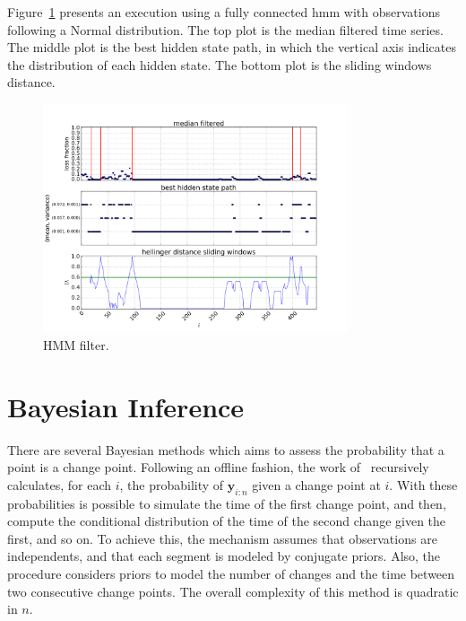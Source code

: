 Figure~\ref{fig:hmm_filter} presents an execution using a fully connected \gls*{hmm}
with observations following a Normal distribution.
The top plot is the median filtered time series.
The middle plot is the best hidden state path, in which the vertical axis
indicates the distribution of each hidden state.
The bottom plot is the sliding windows distance.

\begin{figure}[H]
    \centering
    \includegraphics[width=0.8\textwidth]{./figures/change_point_detection/gaussian_hmm/id115_serverRJODTCLDM031_mac64:66:B3:7B:A1:B8_dtstart2016-05-01_dtend2016-05-11.png}
    \caption{HMM filter.}
\label{fig:hmm_filter}
\end{figure}%

\section{Bayesian Inference}

There are several Bayesian methods which aims to assess the probability that a
point is a change point. Following an offline fashion, the work
of~\cite{exact_and_efficient_bayesian_inference_for_multiple_changepoint_problems}
recursively calculates, for each $i$, the probability of $\mathbf{y}_{i : n}$
given a change point at $i$. With these probabilities is possible to simulate
the time of the first change point, and then, compute the conditional
distribution of the time of the second change given the first, and so on. To
achieve this, the mechanism assumes that observations are independents, and that
each segment is modeled by conjugate priors. Also, the procedure considers
priors to model the number of changes and the time between two consecutive
change points. The overall complexity of this method is quadratic in $n$.

